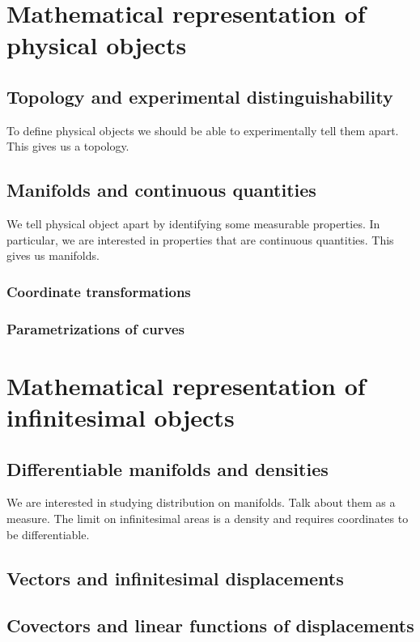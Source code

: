 \documentclass{book}
\begin{document}
\tableofcontents

\chapter{Mathematical representation of physical objects}

\section{Topology and experimental distinguishability}
To define physical objects we should be able to experimentally tell them apart. This gives us a topology.

\section{Manifolds and continuous quantities}
We tell physical object apart by identifying some measurable properties. In particular, we are interested in properties that are continuous quantities. This gives us manifolds.

\subsection{Coordinate transformations}

\subsection{Parametrizations of curves}

\chapter{Mathematical representation of infinitesimal objects}

\section{Differentiable manifolds and densities}
We are interested in studying distribution on manifolds. Talk about them as a measure. The limit on infinitesimal areas is a density and requires coordinates to be differentiable.

\section{Vectors and infinitesimal displacements}

\section{Covectors and linear functions of displacements}
\end{document}
